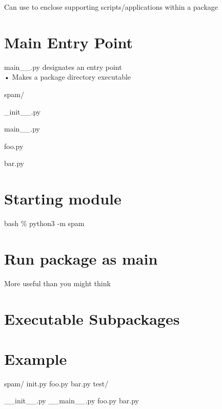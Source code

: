 \documentclass[
  letterpaper,
  DIV=11,
  numbers=noendperiod]{scrreprt}
\newenvironment{Shaded}{\begin{snugshade}}{\end{snugshade}}
\newcommand{\NormalTok}[1]{\textcolor[rgb]{0.00,0.23,0.31}{#1}}
\begin{document}
Can use to enclose supporting scripts/applications within a package


\chapter{Main Entry Point}\label{main-entry-point}

main\_\_.py designates an entry point\\
• Makes a package directory executable

spam/

\_init\_\_.py

main\_\_.py

foo.py

bar.py


\chapter{Starting module}\label{starting-module}

bash \% python3 -m spam


\chapter{Run package as main}\label{run-package-as-main}

More useful than you might think


\chapter{Executable Subpackages}\label{executable-subpackages}


\chapter{Example}\label{example-6}

\begin{Shaded}
\begin{Highlighting}[]
\NormalTok{spam/ init.py foo.py bar.py test/ }
\end{Highlighting}
\end{Shaded}

\begin{Shaded}
\begin{Highlighting}[]
\NormalTok{\_\_init\_\_.py  }
\NormalTok{\_\_main\_\_.py  }
\NormalTok{foo.py  }
\NormalTok{bar.py}
\end{Highlighting}
\end{Shaded}
\end{document}
